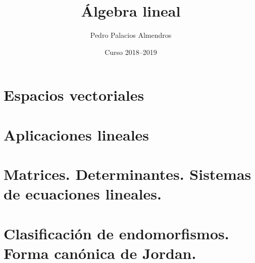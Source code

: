 \documentclass[a4paper, 10pt, openany]{report}
\title{Álgebra lineal}
\author{Pedro Palacios Almendros}
\date{Curso 2018--2019}
\begin{document}
\maketitle

\tableofcontents

\chapter{Espacios vectoriales}

\chapter{Aplicaciones lineales}

\chapter{Matrices. Determinantes. Sistemas de ecuaciones lineales.}



\chapter{Clasificación de endomorfismos. Forma canónica de Jordan.}

\end{document}
